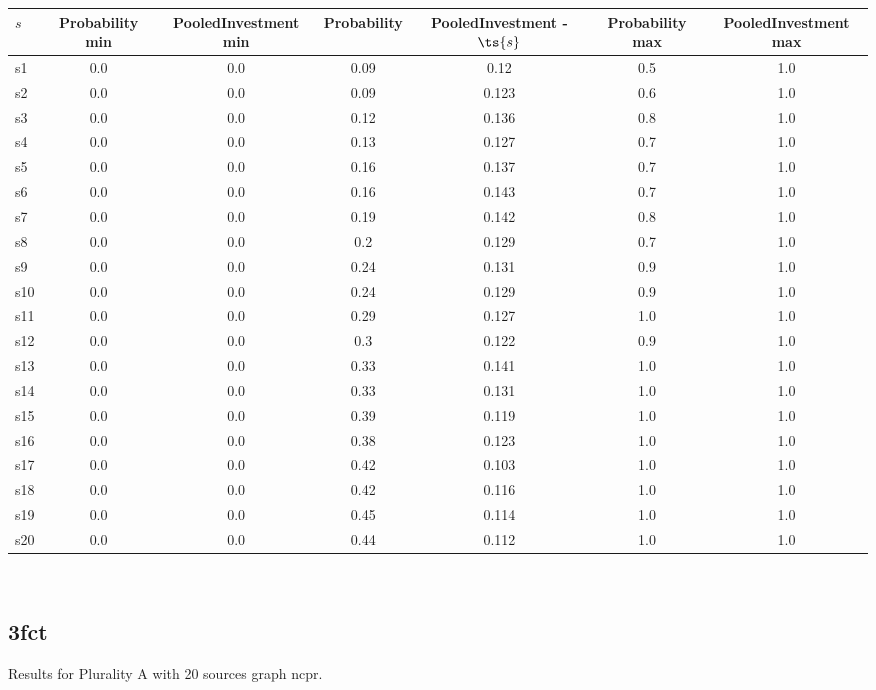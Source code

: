 \documentclass{article}
\begin{document}
\noindent\begin{tabular}{|l|c|c|c|c|c|c|}
\hline
$s$& Probability min & PooledInvestment min & Probability & PooledInvestment - $\ts{s}$ & Probability max & PooledInvestment max\\
\hline
s1 &0.0 & 0.0 & 0.09 & 0.12 & 0.5 & 1.0\\
\hline
s2 &0.0 & 0.0 & 0.09 & 0.123 & 0.6 & 1.0\\
\hline
s3 &0.0 & 0.0 & 0.12 & 0.136 & 0.8 & 1.0\\
\hline
s4 &0.0 & 0.0 & 0.13 & 0.127 & 0.7 & 1.0\\
\hline
s5 &0.0 & 0.0 & 0.16 & 0.137 & 0.7 & 1.0\\
\hline
s6 &0.0 & 0.0 & 0.16 & 0.143 & 0.7 & 1.0\\
\hline
s7 &0.0 & 0.0 & 0.19 & 0.142 & 0.8 & 1.0\\
\hline
s8 &0.0 & 0.0 & 0.2 & 0.129 & 0.7 & 1.0\\
\hline
s9 &0.0 & 0.0 & 0.24 & 0.131 & 0.9 & 1.0\\
\hline
s10 &0.0 & 0.0 & 0.24 & 0.129 & 0.9 & 1.0\\
\hline
s11 &0.0 & 0.0 & 0.29 & 0.127 & 1.0 & 1.0\\
\hline
s12 &0.0 & 0.0 & 0.3 & 0.122 & 0.9 & 1.0\\
\hline
s13 &0.0 & 0.0 & 0.33 & 0.141 & 1.0 & 1.0\\
\hline
s14 &0.0 & 0.0 & 0.33 & 0.131 & 1.0 & 1.0\\
\hline
s15 &0.0 & 0.0 & 0.39 & 0.119 & 1.0 & 1.0\\
\hline
s16 &0.0 & 0.0 & 0.38 & 0.123 & 1.0 & 1.0\\
\hline
s17 &0.0 & 0.0 & 0.42 & 0.103 & 1.0 & 1.0\\
\hline
s18 &0.0 & 0.0 & 0.42 & 0.116 & 1.0 & 1.0\\
\hline
s19 &0.0 & 0.0 & 0.45 & 0.114 & 1.0 & 1.0\\
\hline
s20 &0.0 & 0.0 & 0.44 & 0.112 & 1.0 & 1.0\\
\hline
\end{tabular}\\

\newpage

\subsection{3fct}

\noindent Results for Plurality A with 20 sources graph ncpr.
\end{document}
